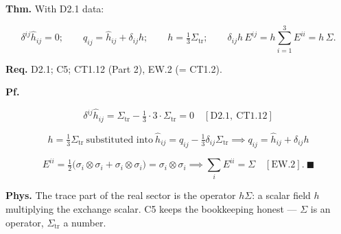 \begin{theorem}\label{tag:EW-12}
\textbf{Thm.} With D2.1 data:

\[
\delta^{ij}\hat h_{ij}=0;\qquad q_{ij}=\hat h_{ij}+\delta_{ij}h;\qquad h=\tfrac13\Sigma_{\mathrm{tr}};\qquad
\delta_{ij}h\,E^{ij}=h\sum_{i=1}^3E^{ii}=h\,\Sigma .
\]

\textbf{Req.} D2.1; C5; CT1.12 (Part 2), EW.2 (= CT1.2).

\textbf{Pf.}

\[
\delta^{ij}\hat h_{ij}=\Sigma_{\mathrm{tr}}-\tfrac13\cdot3\cdot\Sigma_{\mathrm{tr}}=0\quad[\mathrm{D2.1},\ \mathrm{CT1.12}]
\]

\[
h=\tfrac13\Sigma_{\mathrm{tr}}\ \text{substituted into}\ \hat h_{ij}=q_{ij}-\tfrac13\delta_{ij}\Sigma_{\mathrm{tr}}\implies q_{ij}=\hat h_{ij}+\delta_{ij}h
\]

\[
E^{ii}=\tfrac12\bigl(\sigma_i\otimes\sigma_i+\sigma_i\otimes\sigma_i\bigr)=\sigma_i\otimes\sigma_i\implies\sum_iE^{ii}=\Sigma\quad[\mathrm{EW.2}].\ \blacksquare
\]

\textbf{Phys.} The trace part of the real sector is the operator $h\Sigma$: a scalar field $h$ multiplying the exchange scalar. C5 keeps the bookkeeping honest — $\Sigma$ is an operator, $\Sigma_{\mathrm{tr}}$ a number.

\end{theorem}

